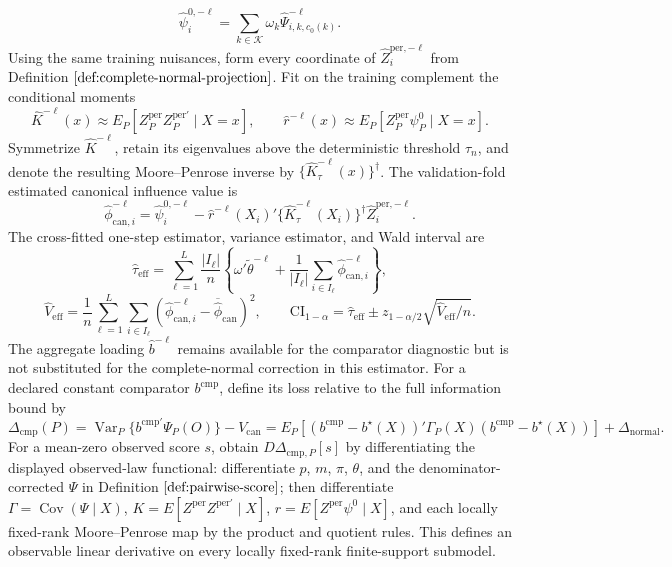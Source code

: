 \[
\widehat\psi_i^{0,-\ell}=\sum_{k\in\mathcal K}\omega_k
\widehat\Psi_{i,k,c_0(k)}^{-\ell}.
\]
Using the same training nuisances, form every coordinate of \(\widehat Z_i^{\mathrm{per},-\ell}\) from Definition \(\ref{def:complete-normal-projection}\).  Fit on the training complement the conditional moments
\[
\widehat K^{-\ell}(x)\approx E_P[Z_P^{\mathrm{per}}Z_P^{\mathrm{per}\prime}\mid X=x],
\qquad
\widehat r^{-\ell}(x)\approx E_P[Z_P^{\mathrm{per}}\psi_P^0\mid X=x].
\]
Symmetrize \(\widehat K^{-\ell}\), retain its eigenvalues above the deterministic threshold \(\tau_n\), and denote the resulting Moore--Penrose inverse by \(\{\widehat K_\tau^{-\ell}(x)\}^{\dagger}\).  The validation-fold estimated canonical influence value is
\[
\widehat\phi_{\mathrm{can},i}^{-\ell}
=\widehat\psi_i^{0,-\ell}
-\widehat r^{-\ell}(X_i)'\{\widehat K_\tau^{-\ell}(X_i)\}^{\dagger}
\widehat Z_i^{\mathrm{per},-\ell}.
\]
The cross-fitted one-step estimator, variance estimator, and Wald interval are
\[
\widehat\tau_{\mathrm{eff}}
=\sum_{\ell=1}^L\frac{|I_\ell|}{n}
\left\{\omega'\widetilde\theta^{-\ell}
+\frac{1}{|I_\ell|}\sum_{i\in I_\ell}\widehat\phi_{\mathrm{can},i}^{-\ell}\right\},
\]
\[
\widehat V_{\mathrm{eff}}
=\frac1n\sum_{\ell=1}^L\sum_{i\in I_\ell}
\left(\widehat\phi_{\mathrm{can},i}^{-\ell}-\overline{\widehat\phi}_{\mathrm{can}}\right)^2,
\qquad
\mathrm{CI}_{1-\alpha}
=\widehat\tau_{\mathrm{eff}}\pm z_{1-\alpha/2}
\sqrt{\widehat V_{\mathrm{eff}}/n}.
\]
The aggregate loading \(\widehat b^{-\ell}\) remains available for the comparator diagnostic but is not substituted for the complete-normal correction in this estimator.
For a declared constant comparator \(b^{\mathrm{cmp}}\), define its loss relative to the full information bound by
\[
\Delta_{\mathrm{cmp}}(P)
=\operatorname{Var}_P\{b^{\mathrm{cmp}\prime}\Psi_P(O)\}-V_{\mathrm{can}}
=E_P[(b^{\mathrm{cmp}}-b^\star(X))'\Gamma_P(X)(b^{\mathrm{cmp}}-b^\star(X))]
+\Delta_{\mathrm{normal}}.
\]
For a mean-zero observed score \(s\), obtain \(D\Delta_{\mathrm{cmp},P}[s]\) by differentiating the displayed observed-law functional: differentiate \(p\), \(m\), \(\pi\), \(\theta\), and the denominator-corrected \(\Psi\) in Definition \(\ref{def:pairwise-score}\); then differentiate \(\Gamma=\operatorname{Cov}(\Psi\mid X)\), \(K=E[Z^{\mathrm{per}}Z^{\mathrm{per}\prime}\mid X]\), \(r=E[Z^{\mathrm{per}}\psi^0\mid X]\), and each locally fixed-rank Moore--Penrose map by the product and quotient rules.  This defines an observable linear derivative on every locally fixed-rank finite-support submodel.

